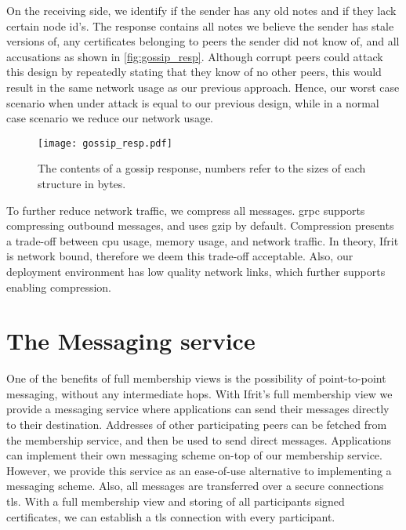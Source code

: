 \documentclass[USenglish]{uit-thesis}
\begin{document}
On the receiving side, we identify if the sender has any old notes and if they lack certain node id's.
The response contains all notes we believe the sender has stale versions of, any certificates belonging to peers the sender did not know of, and all accusations as shown in \autoref{fig:gossip_resp}.
Although corrupt peers could attack this design by repeatedly stating that they know of no other peers, this would result in the same network usage as our previous approach.
Hence, our worst case scenario when under attack is equal to our previous design, while in a normal case scenario we reduce our network usage.

\begin{figure}[h]
	\centering
	\texttt{[image: gossip\_resp.pdf]}
	\caption[Gossip response structure.]{The contents of a gossip response, numbers refer to the sizes of each structure in bytes.}
	\label{fig:gossip_resp}
\end{figure}

To further reduce network traffic, we compress all messages.
\gls{grpc} supports compressing outbound messages, and uses \gls{gzip} by default.
Compression presents a trade-off between \gls{cpu} usage, memory usage, and network traffic.
In theory, Ifrit is network bound, therefore we deem this trade-off acceptable.
Also, our deployment environment has low quality network links, which further supports enabling compression. 




\section{The Messaging service}
One of the benefits of full membership views is the possibility of point-to-point messaging, without any intermediate hops.
With Ifrit's full membership view we provide a messaging service where applications can send their messages directly to their destination.
Addresses of other participating peers can be fetched from the membership service, and then be used to send direct messages.
Applications can implement their own messaging scheme on-top of our membership service.
However, we provide this service as an ease-of-use alternative to implementing a messaging scheme.
Also, all messages are transferred over a secure connections \gls{tls}. 
With a full membership view and storing of all participants signed certificates, we can establish a \gls{tls} connection with every participant.
\end{document}
